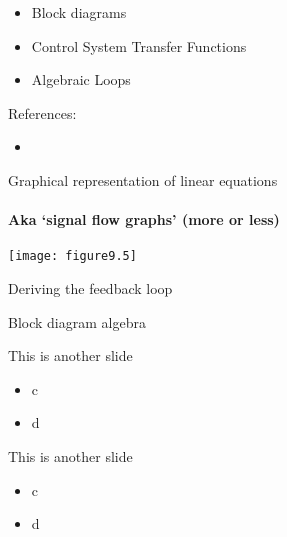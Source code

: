 \documentclass{beamer-control}
\begin{document}

\begin{SUMMARY}
\begin{itemize}
\item Block diagrams
\item Control System Transfer Functions
\item Algebraic Loops
\end{itemize}
\vfill References:
\begin{itemize}
\item {}
\end{itemize}
\end{SUMMARY}




\begin{frame}{Graphical representation of linear equations}
\framesubtitle{Aka `signal flow graphs' (more or less)}

\vfill
\texttt{[image: figure9.5]}

\end{frame}

\begin{frame}{Deriving the feedback loop}


\end{frame}

\begin{frame}{Block diagram algebra}


\end{frame}



\begin{frame}{This is another slide}
\begin{itemize}
\item c
\item d
\end{itemize}
\end{frame}



\begin{frame}{This is another slide}
\begin{itemize}
\item c
\item d
\end{itemize}
\end{frame}


\SUMMARYFRAME
\FINALE
\end{document}
